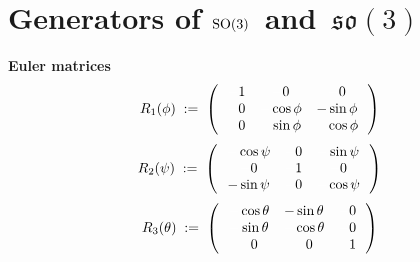 
\section{Generators of \;$\textnormal{SO}(3)$\, and \,$\mathfrak{so}(3)$}


\vskip 0.1cm
\noindent
\textbf{Euler matrices}
\begin{equation*}
R_{1}(\phi)
\; := \;
	\left(\,
		\begin{array}{ccc}
			{\color{white}-}1 & {\color{white}-}0 & {\color{white}-}0 \\
			{\color{white}-}0 & {\color{white}-}\cos\phi & -\sin\phi \\
			{\color{white}-}0 & {\color{white}-}\sin\phi & {\color{white}-}\cos\phi \\
			\end{array}
		\,\right)
\end{equation*}
\begin{equation*}
R_{2}(\psi)
\; := \;
	\left(\,
		\begin{array}{ccc}
			{\color{white}-}\cos\psi & {\color{white}-}0 & {\color{white}-}\sin\psi \\
			{\color{white}-}0 & {\color{white}-}1 & {\color{white}-}0 \\
			-\sin\psi & {\color{white}-}0 & {\color{white}-}\cos\psi \\
			\end{array}
		\,\right)
\end{equation*}
\begin{equation*}
R_{3}(\theta)
\; := \;
	\left(\,
		\begin{array}{ccc}
			{\color{white}-}\cos\theta & -\sin\theta & {\color{white}-}0 \\
			{\color{white}-}\sin\theta & {\color{white}-}\cos\theta & {\color{white}-}0 \\
			{\color{white}-}0 & {\color{white}-}0 & {\color{white}-}1 \\
			\end{array}
		\,\right)
\end{equation*}


